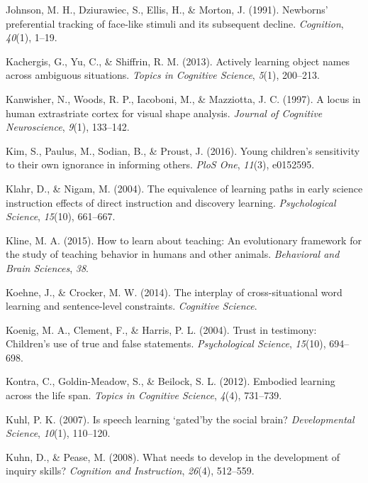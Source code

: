 \documentclass[oneside]{report}
\begin{document}
\hypertarget{ref-johnson1991newborns}{}
Johnson, M. H., Dziurawiec, S., Ellis, H., \& Morton, J. (1991).
Newborns' preferential tracking of face-like stimuli and its subsequent
decline. \emph{Cognition}, \emph{40}(1), 1--19.

\hypertarget{ref-kachergis2013actively}{}
Kachergis, G., Yu, C., \& Shiffrin, R. M. (2013). Actively learning
object names across ambiguous situations. \emph{Topics in Cognitive
Science}, \emph{5}(1), 200--213.

\hypertarget{ref-kanwisher1997locus}{}
Kanwisher, N., Woods, R. P., Iacoboni, M., \& Mazziotta, J. C. (1997). A
locus in human extrastriate cortex for visual shape analysis.
\emph{Journal of Cognitive Neuroscience}, \emph{9}(1), 133--142.

\hypertarget{ref-kim2016young}{}
Kim, S., Paulus, M., Sodian, B., \& Proust, J. (2016). Young children's
sensitivity to their own ignorance in informing others. \emph{PloS One},
\emph{11}(3), e0152595.

\hypertarget{ref-klahr2004equivalence}{}
Klahr, D., \& Nigam, M. (2004). The equivalence of learning paths in
early science instruction effects of direct instruction and discovery
learning. \emph{Psychological Science}, \emph{15}(10), 661--667.

\hypertarget{ref-kline2015learn}{}
Kline, M. A. (2015). How to learn about teaching: An evolutionary
framework for the study of teaching behavior in humans and other
animals. \emph{Behavioral and Brain Sciences}, \emph{38}.

\hypertarget{ref-koehne2014interplay}{}
Koehne, J., \& Crocker, M. W. (2014). The interplay of cross-situational
word learning and sentence-level constraints. \emph{Cognitive Science}.

\hypertarget{ref-koenig2004trust}{}
Koenig, M. A., Clement, F., \& Harris, P. L. (2004). Trust in testimony:
Children's use of true and false statements. \emph{Psychological
Science}, \emph{15}(10), 694--698.

\hypertarget{ref-kontra2012embodied}{}
Kontra, C., Goldin-Meadow, S., \& Beilock, S. L. (2012). Embodied
learning across the life span. \emph{Topics in Cognitive Science},
\emph{4}(4), 731--739.

\hypertarget{ref-kuhl2007speech}{}
Kuhl, P. K. (2007). Is speech learning `gated'by the social brain?
\emph{Developmental Science}, \emph{10}(1), 110--120.

\hypertarget{ref-kuhn2008needs}{}
Kuhn, D., \& Pease, M. (2008). What needs to develop in the development
of inquiry skills? \emph{Cognition and Instruction}, \emph{26}(4),
512--559.
\end{document}
